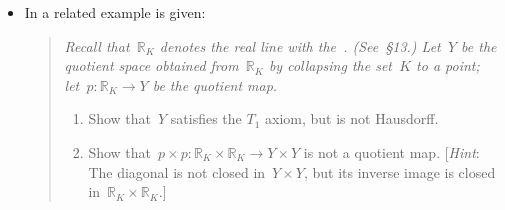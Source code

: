 \begin{itemize}
\begin{quote}
\begin{enumerate}[label=\arabic*.]
				\item
					Show that there is a unique map (of sets)
					\[
						f \colon (ℚ_{> 0} × ℚ) / {∼_2} \to ℚ_{> 0} / {∼_1} × ℚ
					\]
					with the property that~$f(π_2(x, y)) = (π_1(x), y)$.
					Show that~$f$ defined a continuous, bijective map.

				\item
					For each natural number~$n ≥ 1$, we define
					\[
						U_n
						=
						\biggl\{
							(x, y) ∈ ℚ_{> 0} × ℚ
							\suchthat[\bigg]
							\abs{x - n}
							<
							\min\biggl\{ \abs[\bigg]{ y - \frac{\sqrt{2}}{n} }, \frac{1}{2} \biggr\}
						\biggr\} \,,
					\]
					and we put
					\[
						U = ⋃_{n ≥ 1} U_n \,.
					\]
					Show that~$π_2(U)$ is open.
					(Hint: Use that~$\sqrt{2}$ is irrational to prove that~$π_2^{-1} π_2(U) = U$.)
				\item
					Let~$ε > 0$ and~$n ∈ ℕ$.
					Assume that~$\sqrt{2} / n < ε$.
					Prove that there are no~$a < n < b$ so that
					\[
						\{
							(x, y) ∈ ℚ_{> 0} × ℚ
							\suchthat
							\text{$a < x < b$ and~$-ε < y < ε$}
						\}
						\subset
						U_n \,.
					\]

				\item
					Show that the set~$f(π_2(U))$ is not a neighbourhood of the element $(π_1(1), 0)$.
					In particular, the set is not open.

				\item
					Conclude that~$f$ is not a homeomorphism.

			\end{enumerate}
		\end{quote}

	\item
		In \autocite[Chapter~2, §22, Exercise~6, p.~143]{munkres_topology} a related example is given:
		\begin{quote}
			\itshape
			Recall that~$ℝ_K$ denotes the real line with the~.
			(See~§13.)
			Let~$Y$ be the quotient space obtained from~$ℝ_K$ by collapsing the set~$K$ to a point;
			let~$p \colon ℝ_K \to Y$ be the quotient map.
			\begin{enumerate}[label=(\alph*\upshape)]

				\item
					Show that~$Y$ satisfies the $T_1$ axiom, but is not Hausdorff.

				\item
					Show that~$p × p \colon ℝ_K × ℝ_K \to Y × Y$ is not a quotient map.
					\textup[\emph{Hint}:
					The diagonal is not closed in~$Y × Y$, but its inverse image is closed in~$ℝ_K × ℝ_K$.\textup]


\end{enumerate}
\end{quote}
\end{itemize}
